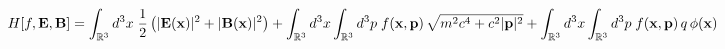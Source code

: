 \documentclass[preview]{standalone}
\begin{document}
\begin{align*}
\special{dvisvgm:raw <g id='unique000'>}H[f,\mathbf{E},\mathbf{B}] = 
                          \int_{\mathbb{R}^3} d^3x \;\frac{1}{2}\left(|\mathbf{E}(\mathbf{x})|^2 + |\mathbf{B}(\mathbf{x})|^2\right)
                          +
                          \int_{\mathbb{R}^3} d^3x \int_{\mathbb{R}^3} d^3p \;
                          f(\mathbf{x},\mathbf{p}) \, \sqrt{m^2 c^4 + c^2|\mathbf{p}|^2}
                            +  
                            \int_{\mathbb{R}^3} d^3x \int_{\mathbb{R}^3} d^3p \;
                            f(\mathbf{x},\mathbf{p}) \, q \,\phi(\mathbf{x})\special{dvisvgm:raw </g>}
\end{align*}
\end{document}
